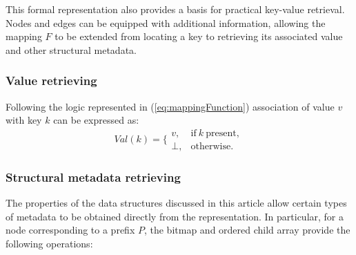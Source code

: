 \documentclass[pdflatex,sn-mathphys-num]{sn-jnl}%
\theoremstyle{thmstyleone}%
\theoremstyle{thmstyletwo}%
\theoremstyle{thmstylethree}%
\begin{document}
This formal representation also provides a basis for practical key-value retrieval.
Nodes and edges can be equipped with additional information, allowing the mapping $F$ to be extended
from locating a key to retrieving its associated value and other structural metadata.

      \subsubsection{Value retrieving}\label{value-retrieving}

      Following the logic represented in (\ref{eq:mappingFunction}) association of value $v$ with key $k$ can be
      expressed as:
\begin{equation}
Val(k)= \Biggl\{
\begin{array}{ll}
    v, & \text{if}~k~\text{present},\\
    \bot, & \text{otherwise}.
\end{array}\label{eq:mappingValue}
\end{equation}

      \subsubsection{Structural metadata retrieving}\label{meta-retrieving}
The properties of the data structures discussed in this article allow certain types of
metadata to be obtained directly from the representation. In particular, for a node corresponding
to a prefix $P$, the bitmap and ordered child array provide the following operations:
\end{document}
